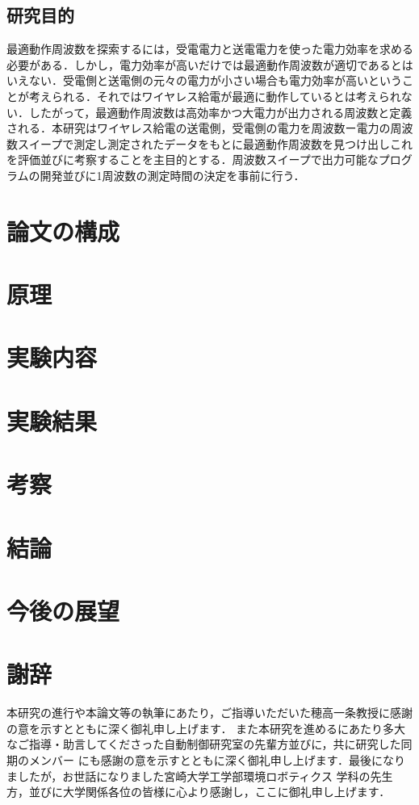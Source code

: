 \documentclass[12pt]{jarticle}
\begin{document}
\subsection{研究目的}
最適動作周波数を探索するには，受電電力と送電電力を使った電力効率を求める必要がある．しかし，電力効率が高いだけでは最適動作周波数が適切であるとはいえない．受電側と送電側の元々の電力が小さい場合も電力効率が高いということが考えられる．それではワイヤレス給電が最適に動作しているとは考えられない．したがって，最適動作周波数は高効率かつ大電力が出力される周波数と定義される．本研究はワイヤレス給電の送電側，受電側の電力を周波数ー電力の周波数スイープで測定し測定されたデータをもとに最適動作周波数を見つけ出しこれを評価並びに考察することを主目的とする．周波数スイープで出力可能なプログラムの開発並びに1周波数の測定時間の決定を事前に行う．
\clearpage
\section{論文の構成}

\clearpage
\section{原理}

\section{実験内容}

\section{実験結果}

\section{考察}

\section{結論}

\section{今後の展望}

\clearpage
\section{謝辞}
 本研究の進行や本論文等の執筆にあたり，ご指導いただいた穂高一条教授に感謝の意を示すとともに深く御礼申し上げます．
また本研究を進めるにあたり多大なご指導・助言してくださった自動制御研究室の先輩方並びに，共に研究した同期のメンバー
にも感謝の意を示すとともに深く御礼申し上げます．最後になりましたが，お世話になりました宮崎大学工学部環境ロボティクス
学科の先生方，並びに大学関係各位の皆様に心より感謝し，ここに御礼申し上げます．
\end{document}
